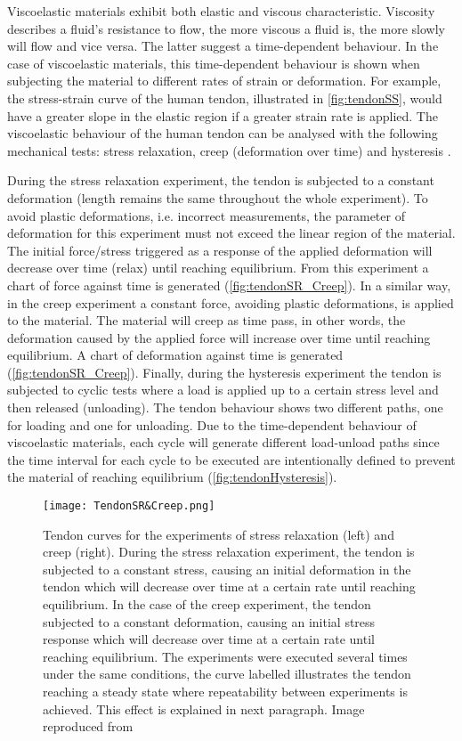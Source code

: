 Viscoelastic materials exhibit both elastic and viscous characteristic. Viscosity describes a fluid's resistance to flow, the more viscous a fluid is, the more slowly will flow and vice versa. The latter suggest a time-dependent behaviour. In the case of viscoelastic materials, this time-dependent behaviour is shown when subjecting the material to different rates of strain or deformation. For example, the stress-strain curve of the human tendon, illustrated in \autoref{fig:tendonSS}, would have a greater slope in the elastic region if a greater strain rate is applied. The viscoelastic behaviour of the human tendon can be analysed with the following mechanical tests: stress relaxation, creep (deformation over time) and hysteresis \cite{nordin2001basic}.

During the stress relaxation experiment, the tendon is subjected to a constant deformation (length remains the same throughout the whole experiment). To avoid plastic deformations, i.e. incorrect measurements, the parameter of deformation for this experiment must not exceed the linear region of the material. The initial force/stress triggered as a response of the applied deformation will decrease over time (relax) until reaching equilibrium. From this experiment a chart of force against time is generated (\autoref{fig:tendonSR_Creep}). In a similar way, in the creep experiment a constant force, avoiding plastic deformations, is applied to the material. The material will creep as time pass, in other words, the deformation caused by the applied force will increase over time until reaching equilibrium. A chart of deformation against time is generated (\autoref{fig:tendonSR_Creep}). Finally, during the hysteresis experiment the tendon is subjected to cyclic tests where a load is applied up to a certain stress level and then released (unloading). The tendon behaviour shows two different paths, one for loading and one for unloading. Due to the time-dependent behaviour of viscoelastic materials, each cycle will generate different load-unload paths since the time interval for each cycle to be executed are intentionally defined to prevent the material of reaching equilibrium (\autoref{fig:tendonHysteresis}).

\begin{figure}[htb!]
    \centering
    \texttt{[image: TendonSR\&Creep.png]}
    \caption{Tendon curves for the experiments of stress relaxation (left) and creep (right). During the stress relaxation experiment, the tendon is subjected to a constant stress, causing an initial deformation in the tendon which will decrease over time at a certain rate until reaching equilibrium. In the case of the creep experiment, the tendon subjected to a constant deformation, causing an initial stress response which will decrease over time at a certain rate until reaching equilibrium. The experiments were executed several times under the same conditions, the curve labelled  illustrates the tendon reaching a steady state where repeatability between experiments is achieved. This effect is explained in next paragraph. Image reproduced from \cite{maurel1998biomechanical} }
    \label{fig:tendonSR_Creep}
\end{figure}

